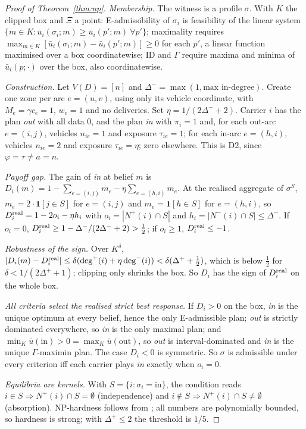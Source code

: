 \documentclass[preprint,11pt]{elsarticle}
\theoremstyle{definition}
\theoremstyle{remark}
\newcommand{\ub}{\bar u}
\begin{document}
\begin{proof}[Proof of Theorem~\ref{thm:np}]
\emph{Membership.} The witness is a profile $\sigma$. With $K$ the clipped box and $\Xi$ a point: E-admissibility of $\sigma_i$ is feasibility of the linear system $\{m\in K:\ub_i(\sigma_i;m)\ge\ub_i(p';m)\ \forall p'\}$; maximality requires $\max_{m\in K}[\ub_i(\sigma_i;m)-\ub_i(p';m)]\ge0$ for each $p'$, a linear function maximised over a box coordinatewise; ID and $\Gamma$ require maxima and minima of $\ub_i(p;\cdot)$ over the box, also coordinatewise.

\emph{Construction.} Let $V(D)=[n]$ and $\Delta^-=\max(1,\text{max in-degree})$. Create one zone per arc $e=(u,v)$, using only its vehicle coordinate, with $M_e=\gamma c_e=1$, $w_e=1$ and no deliveries. Set $\eta=1/(2\Delta^-+2)$. Carrier $i$ has the plan \emph{out} with all data $0$, and the plan \emph{in} with $\pi_i=1$ and, for each out-arc $e=(i,j)$, vehicles $n_{ie}=1$ and exposure $\tau_{ie}=1$; for each in-arc $e=(h,i)$, vehicles $n_{ie}=2$ and exposure $\tau_{ie}=\eta$; zero elsewhere. This is D2, since $\varphi=\tau\ne a=n$.

\emph{Payoff gap.} The gain of \emph{in} at belief $m$ is $D_i(m)=1-\sum_{e=(i,j)}m_e-\eta\sum_{e=(h,i)}m_e$. At the realised aggregate of $\sigma^S$, $m_e=2\cdot\mathbf 1[j\in S]$ for $e=(i,j)$ and $m_e=\mathbf 1[h\in S]$ for $e=(h,i)$, so $D_i^{\rm real}=1-2o_i-\eta h_i$ with $o_i=|N^+(i)\cap S|$ and $h_i=|N^-(i)\cap S|\le\Delta^-$. If $o_i=0$, $D_i^{\rm real}\ge1-\Delta^-/(2\Delta^-+2)>\tfrac12$; if $o_i\ge1$, $D_i^{\rm real}\le-1$.

\emph{Robustness of the sign.} Over $K^\delta$, $|D_i(m)-D_i^{\rm real}|\le\delta(\deg^+(i)+\eta\deg^-(i))<\delta(\Delta^++\tfrac12)$, which is below $\tfrac12$ for $\delta<1/(2\Delta^++1)$; clipping only shrinks the box. So $D_i$ has the sign of $D_i^{\rm real}$ on the whole box.

\emph{All criteria select the realised strict best response.} If $D_i>0$ on the box, \emph{in} is the unique optimum at every belief, hence the only E-admissible plan; \emph{out} is strictly dominated everywhere, so \emph{in} is the only maximal plan; and $\min_K\ub(\text{in})>0=\max_K\ub(\text{out})$, so \emph{out} is interval-dominated and \emph{in} is the unique $\Gamma$-maximin plan. The case $D_i<0$ is symmetric. So $\sigma$ is admissible under every criterion iff each carrier plays \emph{in} exactly when $o_i=0$.

\emph{Equilibria are kernels.} With $S=\{i:\sigma_i=\text{in}\}$, the condition reads $i\in S\Rightarrow N^+(i)\cap S=\emptyset$ (independence) and $i\notin S\Rightarrow N^+(i)\cap S\ne\emptyset$ (absorption). NP-hardness follows from \citet{Chvatal1973}; all numbers are polynomially bounded, so hardness is strong; with $\Delta^+\le2$ \citep{Fraenkel1981} the threshold is $1/5$.
\end{proof}
\end{document}
